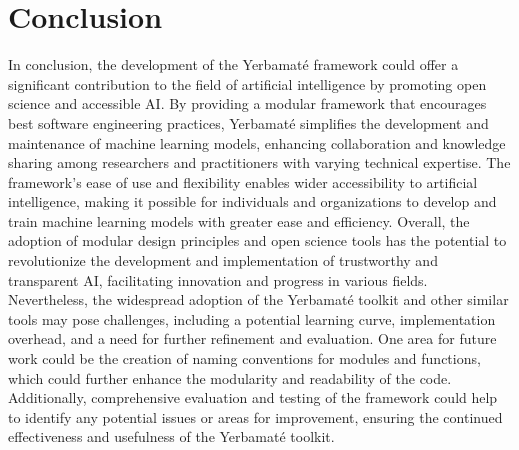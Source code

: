 \documentclass{article}
\begin{document}
\section{Conclusion}
In conclusion, the development of the Yerbamaté framework could offer a significant contribution to the field of artificial intelligence by promoting open science and accessible AI. By providing a modular framework that encourages best software engineering practices, Yerbamaté simplifies the development and maintenance of machine learning models, enhancing collaboration and knowledge sharing among researchers and practitioners with varying technical expertise. The framework's ease of use and flexibility enables wider accessibility to artificial intelligence, making it possible for individuals and organizations to develop and train machine learning models with greater ease and efficiency. Overall, the adoption of modular design principles and open science tools has the potential to revolutionize the development and implementation of trustworthy and transparent AI, facilitating innovation and progress in various fields. Nevertheless, the widespread adoption of the Yerbamaté toolkit and other similar tools may pose challenges, including a potential learning curve, implementation overhead, and a need for further refinement and evaluation. One area for future work could be the creation of naming conventions for modules and functions, which could further enhance the modularity and readability of the code. Additionally, comprehensive evaluation and testing of the framework could help to identify any potential issues or areas for improvement, ensuring the continued effectiveness and usefulness of the Yerbamaté toolkit.
 
\newpage

\printbibliography
\end{document}

